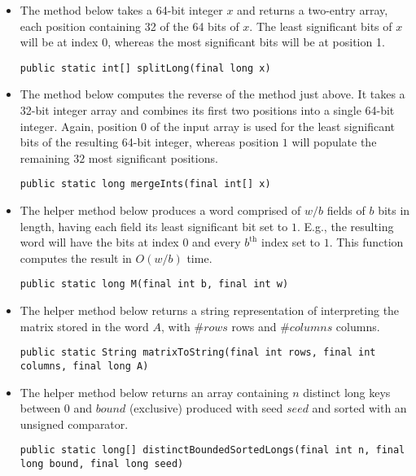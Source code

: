 \begin{itemize}
    \item
    The method below takes a 64-bit integer $x$ and returns a two-entry array, each position containing 32 of the 64 bits of $x$. The least significant bits of $x$ will be at index 0, whereas the most significant bits will be at position 1.
    \begin{lstlisting}
public static int[] splitLong(final long x)
    \end{lstlisting}
    
    \item
    The method below computes the reverse of the method just above. It takes a 32-bit integer array and combines its first two positions into a single 64-bit integer. Again, position $0$ of the input array is used for the least significant bits of the resulting 64-bit integer, whereas position $1$ will populate the remaining $32$ most significant positions.
    \begin{lstlisting}
public static long mergeInts(final int[] x)
    \end{lstlisting}
    
    \item
    The helper method below produces a word comprised of $w / b$ fields of $b$ bits in length, having each field its least significant bit set to $1$. E.g., the resulting word will have the bits at index $0$ and every $b^{\text{th}}$ index set to $1$. This function computes the result in $O(w/b)$ time.
    \begin{lstlisting}
public static long M(final int b, final int w)
    \end{lstlisting}

    \item
    The helper method below returns a string representation of interpreting the matrix stored in the word $A$, with $\#rows$ rows and $\#columns$ columns.
    \begin{lstlisting}
public static String matrixToString(final int rows, final int columns, final long A)
    \end{lstlisting}
    
    \item
    The helper method below returns an array containing $n$ distinct {\ttfamily long} keys between $0$ and $bound$ (exclusive) produced with seed $seed$ and sorted with an unsigned comparator.
    \begin{lstlisting}
public static long[] distinctBoundedSortedLongs(final int n, final long bound, final long seed)
    \end{lstlisting}
    

\end{itemize}
